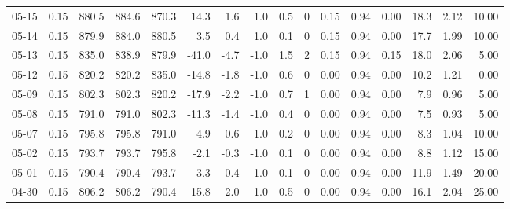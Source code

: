 \begin{threeparttable}
{\begin{tabular}{lrrrrrrrrrrrrrrr}
  05-15 &     0.15 & 880.5 & 884.6 & 870.3 &       14.3 &            1.6 &                      1.0 &                 0.5 &              0 &       0.15 &      0.94 &           0.00 &             18.3 &            2.12 &                  10.00 \\
  05-14 &     0.15 & 879.9 & 884.0 & 880.5 &        3.5 &            0.4 &                      1.0 &                 0.1 &              0 &       0.15 &      0.94 &           0.00 &             17.7 &            1.99 &                  10.00 \\
  05-13 &     0.15 & 835.0 & 838.9 & 879.9 &      -41.0 &           -4.7 &                     -1.0 &                 1.5 &              2 &       0.15 &      0.94 &           0.15 &             18.0 &            2.06 &                   5.00 \\
  05-12 &     0.15 & 820.2 & 820.2 & 835.0 &      -14.8 &           -1.8 &                     -1.0 &                 0.6 &              0 &       0.00 &      0.94 &           0.00 &             10.2 &            1.21 &                   0.00 \\
  05-09 &     0.15 & 802.3 & 802.3 & 820.2 &      -17.9 &           -2.2 &                     -1.0 &                 0.7 &              1 &       0.00 &      0.94 &           0.00 &              7.9 &            0.96 &                   5.00 \\
  05-08 &     0.15 & 791.0 & 791.0 & 802.3 &      -11.3 &           -1.4 &                     -1.0 &                 0.4 &              0 &       0.00 &      0.94 &           0.00 &              7.5 &            0.93 &                   5.00 \\
  05-07 &     0.15 & 795.8 & 795.8 & 791.0 &        4.9 &            0.6 &                      1.0 &                 0.2 &              0 &       0.00 &      0.94 &           0.00 &              8.3 &            1.04 &                  10.00 \\
  05-02 &     0.15 & 793.7 & 793.7 & 795.8 &       -2.1 &           -0.3 &                     -1.0 &                 0.1 &              0 &       0.00 &      0.94 &           0.00 &              8.8 &            1.12 &                  15.00 \\
  05-01 &     0.15 & 790.4 & 790.4 & 793.7 &       -3.3 &           -0.4 &                     -1.0 &                 0.1 &              0 &       0.00 &      0.94 &           0.00 &             11.9 &            1.49 &                  20.00 \\
  04-30 &     0.15 & 806.2 & 806.2 & 790.4 &       15.8 &            2.0 &                      1.0 &                 0.5 &              0 &       0.00 &      0.94 &           0.00 &             16.1 &            2.04 &                  25.00 \\

\end{tabular}}
\end{threeparttable}
